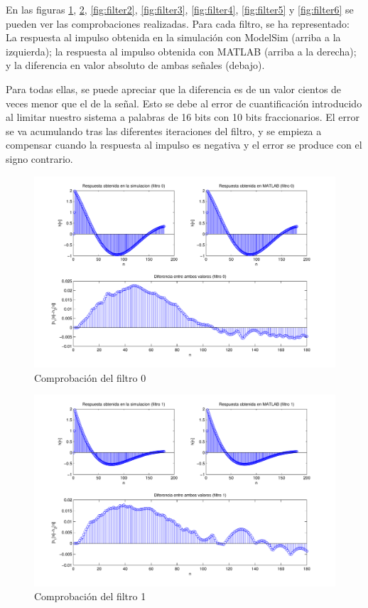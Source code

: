 \documentclass[a4paper,12pt]{report}
\begin{document}
En las figuras \ref{fig:filter0}, \ref{fig:filter1}, \ref{fig:filter2}, \ref{fig:filter3}, \ref{fig:filter4}, \ref{fig:filter5} y \ref{fig:filter6} se pueden ver las comprobaciones realizadas. Para cada filtro, se ha representado: La respuesta al impulso obtenida en la simulación con ModelSim (arriba a la izquierda); la respuesta al impulso obtenida con MATLAB (arriba a la derecha); y la diferencia en valor absoluto de ambas señales (debajo).

Para todas ellas, se puede apreciar que la diferencia es de un valor cientos de veces menor que el de la señal. Esto se debe al error de cuantificación introducido al limitar nuestro sistema a palabras de 16 bits con 10 bits fraccionarios. El error se va acumulando tras las diferentes iteraciones del filtro, y se empieza a compensar cuando la respuesta al impulso es negativa y el error se produce con el signo contrario. 

\begin{figure}[hbt]
\includegraphics[width=\textwidth]{img/respfiltro0.pdf} 
\caption{Comprobación del filtro 0} \label{fig:filter0}
\end{figure}

\begin{figure}[hbt]
\includegraphics[width=\textwidth]{img/respfiltro1.pdf} 
\caption{Comprobación del filtro 1} \label{fig:filter1}
\end{figure}
\end{document}
